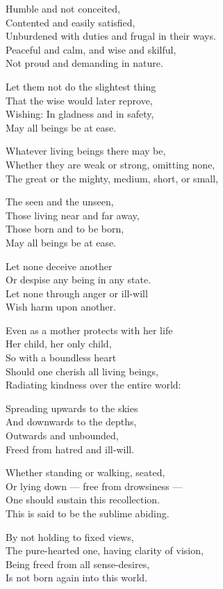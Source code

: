Humble and not conceited,\\
Contented and easily satisfied,\\
Unburdened with duties and frugal in their ways.\\
Peaceful and calm, and wise and skilful,\\
Not proud and demanding in nature.

Let them not do the slightest thing\\
That the wise would later reprove,\\
Wishing: In gladness and in safety,\\
May all beings be at ease.

Whatever living beings there may be,\\
Whether they are weak or strong, omitting none,\\
The great or the mighty, medium, short, or small,

The seen and the unseen,\\
Those living near and far away,\\
Those born and to be born,\\
May all beings be at ease.

Let none deceive another\\
Or despise any being in any state.\\
Let none through anger or ill-will\\
Wish harm upon another.

Even as a mother protects with her life\\
Her child, her only child,\\
So with a boundless heart\\
Should one cherish all living beings,\\
Radiating kindness over the entire world:

Spreading upwards to the skies\\
And downwards to the depths,\\
Outwards and unbounded,\\
Freed from hatred and ill-will.

Whether standing or walking, seated, \\
Or lying down --- free from drowsiness ---\\
One should sustain this recollection.\\
This is said to be the sublime abiding.

By not holding to fixed views,\\
The pure-hearted one, having clarity of vision,\\
Being freed from all sense-desires,\\
Is not born again into this world.

